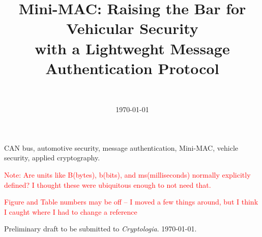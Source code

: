 \documentclass[10pt,final,conference,compsoc]{IEEEtran}
\begin{document}
\title{Mini-MAC: Raising the Bar for Vehicular Security\\
with a Lightweght Message Authentication Protocol}



\author{
\\}

\date{\today}

\maketitle



\begin{IEEEkeywords}
	CAN bus,
	automotive security,
	message authentication,
	Mini-MAC,
	vehicle security,
	applied cryptography.
\end{IEEEkeywords}

\textcolor{red}{Note: Are units like B(bytes), b(bits), and ms(milliseconds) normally explicitly defined? I thought these were ubiquitous enough to not need that.}

\textcolor{red}{Figure and Table numbers may be off -- I moved a few things around, but I think I caught where I had to change a reference}
















	









\bigskip \noindent
Preliminary draft to be submitted to {\it Cryptologia}. {\today}.
\end{document}
